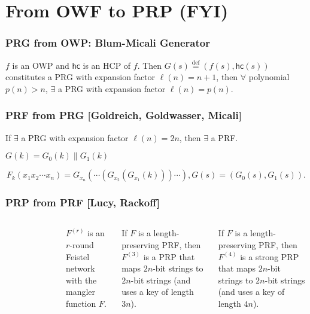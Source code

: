 \section{From OWF to PRP (FYI)}
\begin{frame}\frametitle{PRG from OWP: Blum-Micali Generator}
\begin{theorem}
$f$ is an OWP and $\mathsf{hc}$ is an HCP of $f$. Then $G(s) \overset{\text{def}}{=} (f(s), \mathsf{hc}(s))$ constitutes a PRG with expansion factor $\ell(n) = n+1$, then $\forall$ polynomial $p(n) > n$, $\exists$ a PRG with expansion factor $\ell(n) = p(n)$.
\end{theorem}
\begin{figure}
\begin{center}

\end{center}
\end{figure}
\end{frame}
\begin{frame}\frametitle{PRF from PRG [Goldreich, Goldwasser, Micali]}
\begin{theorem}
If $\exists$ a PRG with expansion factor $\ell(n) = 2n$, then $\exists$ a PRF.
\end{theorem}
$G(k) = G_{0}(k)\| G_{1}(k)$
\begin{figure}
\begin{center}

\end{center}
\end{figure}
\[F_k(x_1x_2\cdots x_n) = G_{x_n}(\cdots(G_{x_2}(G_{x_1}(k)))\cdots), G(s)=(G_0(s),G_1(s)).\]
\end{frame}
\begin{frame}\frametitle{PRP from PRF [Lucy, Rackoff]}
\begin{columns}[C]
\begin{figure}
\begin{center}

\end{center}
\end{figure}
$F^{(r)}$ is an $r$-round Feistel network with the mangler function $F$.
\begin{theorem}
If $F$ is a length-preserving PRF, then $F^{(3)}$ is a PRP that maps $2n$-bit strings to $2n$-bit strings (and uses a key of length $3n$).
\end{theorem}
\begin{theorem}
If $F$ is a length-preserving PRF, then $F^{(4)}$ is a strong PRP that maps $2n$-bit strings to $2n$-bit strings (and uses a key of length $4n$).
\end{theorem}
\end{columns}
\end{frame}

